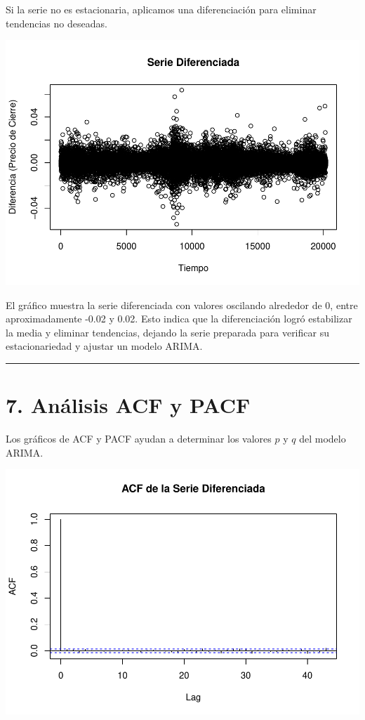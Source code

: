 \documentclass[
]{book}
\begin{document}
Si la serie no es estacionaria, aplicamos una diferenciación para eliminar tendencias no deseadas.

\includegraphics{bookdown_time_series_files/figure-latex/differencing-2-1.pdf}

El gráfico muestra la serie diferenciada con valores oscilando alrededor de 0, entre aproximadamente -0.02 y 0.02. Esto indica que la diferenciación logró estabilizar la media y eliminar tendencias, dejando la serie preparada para verificar su estacionariedad y ajustar un modelo ARIMA.

\begin{center}\rule{0.5\linewidth}{0.5pt}\end{center}

\section{7. Análisis ACF y PACF}\label{anuxe1lisis-acf-y-pacf}

Los gráficos de ACF y PACF ayudan a determinar los valores \(p\) y \(q\) del modelo ARIMA.

\includegraphics{bookdown_time_series_files/figure-latex/identify-parameters-1.pdf}
\end{document}
